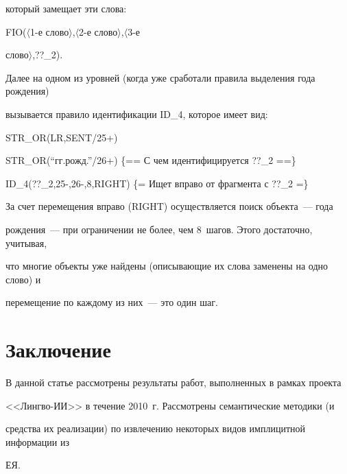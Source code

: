 который замещает эти слова:  





{\sf      FIO($\langle$1-е слово$\rangle$,$\langle$2-е слово$\rangle$,$\langle$3-е 


слово$\rangle$,??\_2). }





     Далее на одном из уровней (когда уже сработали правила выделения года рождения) 


вызывается правило идентификации {\sf ID\_4}, которое имеет вид: 





{\sf        STR\_OR(LR,SENT/25+) }





{\sf        STR\_OR(``гг.рожд.''/26+) \{== С чем идентифицируется ??\_2 ==\}}





{\sf        ID\_4(??\_2,25-,26-,8,RIGHT) \{= Ищет вправо от фрагмента с ??\_2 =\}}





     За счет перемещения вправо ({\sf RIGHT}) осуществляется поиск объекта~--- года 


рождения~--- при ограничении не более, чем 8~шагов. Этого достаточно, учитывая, 


что многие объекты уже найдены (описывающие их слова заменены на одно слово) и 


перемещение по каждому из них~--- это один шаг.  


   


\section*{Заключение}





     В данной статье рассмотрены результаты работ, выполненных в рамках проекта 


<<Лингво-ИИ>> в течение 2010~г. Рассмотрены семантические методики (и 


средства их реализации) по извлечению некоторых видов имплицитной информации из 


ЕЯ. 





